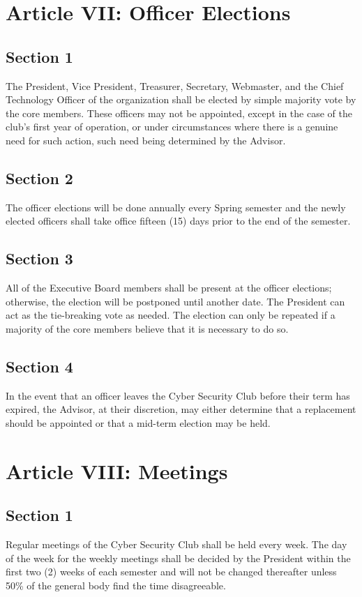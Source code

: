 \documentclass[10pt]{article}
\begin{document}
\section*{Article VII: Officer Elections}
\subsection*{Section 1}
The President, Vice President, Treasurer, Secretary, Webmaster, and the Chief Technology Officer of the
organization shall be elected by simple majority vote by the core members. These officers may not be
appointed, except in the case of the club's first year of operation, or under circumstances where there is
a genuine need for such action, such need being determined by the Advisor.
\subsection*{Section 2}
The officer elections will be done annually every Spring semester and the newly elected officers shall
take office fifteen (15) days prior to the end of the semester.
\subsection*{Section 3}
All of the Executive Board members shall be present at the officer elections; otherwise, the election
will be postponed until another date. The President can act as the tie-breaking vote as needed. The
election can only be repeated if a majority of the core members believe that it is necessary to do so.
\subsection*{Section 4}
In the event that an officer leaves the Cyber Security Club before their term has expired, the Advisor, at
their discretion, may either determine that a replacement should be appointed or that a mid-term
election may be held.
\vspace{0.2in}

\section*{Article VIII: Meetings}
\subsection*{Section 1}
Regular meetings of the Cyber Security Club shall be held every week. The day of the week for the
weekly meetings shall be decided by the President within the first two (2) weeks of each semester and
will not be changed thereafter unless 50\% of the general body find the time disagreeable.
\end{document}
